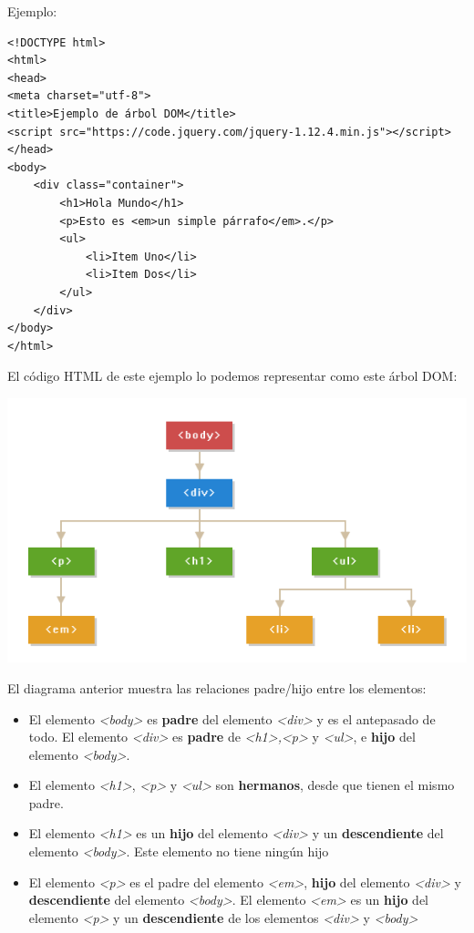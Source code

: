 \documentclass[a4paper, oneside]{article}
\begin{document}
Ejemplo:

\begin{verbatim}
<!DOCTYPE html>
<html>
<head>
<meta charset="utf-8">
<title>Ejemplo de árbol DOM</title>
<script src="https://code.jquery.com/jquery-1.12.4.min.js"></script>
</head>
<body>
    <div class="container">
        <h1>Hola Mundo</h1>
        <p>Esto es <em>un simple párrafo</em>.</p>
        <ul>
            <li>Item Uno</li>
            <li>Item Dos</li>
        </ul>
    </div>
</body>
</html>                                		
\end{verbatim}


El código HTML de este ejemplo lo podemos representar como este árbol DOM:


\begin{center}
\includegraphics[width=.9\linewidth]{./img/arbol-dom.png}
\end{center}


El diagrama anterior muestra las relaciones padre/hijo entre los elementos:

\begin{itemize}
\item El elemento \emph{<body>} es \textbf{padre} del elemento \emph{<div>} y es el antepasado de todo. El elemento \emph{<div>} es \textbf{padre} de \emph{<h1>,<p>} y \emph{<ul>}, e \textbf{hijo} del elemento \emph{<body>}.
\item El elemento \emph{<h1>}, \emph{<p>} y \emph{<ul>} son \textbf{hermanos}, desde que tienen el mismo padre.
\item El elemento \emph{<h1>} es un \textbf{hijo} del elemento \emph{<div>} y un \textbf{descendiente} del elemento \emph{<body>}. Este elemento no tiene ningún hijo
\item El elemento \emph{<p>} es el padre del elemento \emph{<em>}, \textbf{hijo} del elemento \emph{<div>} y \textbf{descendiente} del elemento \emph{<body>}. El elemento \emph{<em>} es un \textbf{hijo} del elemento \emph{<p>} y un \textbf{descendiente} de los elementos \emph{<div>} y \emph{<body>}
\end{itemize}
\end{document}
